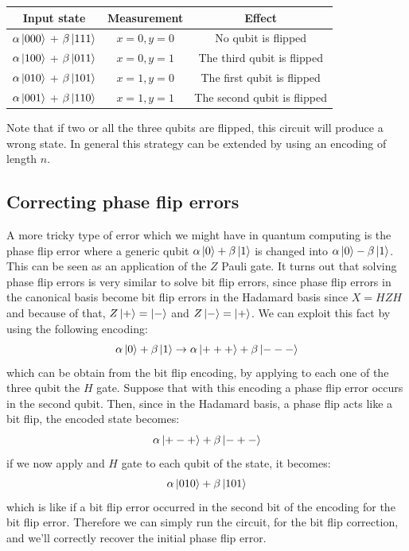 \documentclass{article}
\begin{document}
	\begin{table}[H]
		\begin{center}
		\begin{tabular}{|c|c|c|}
			\hline
			Input state & Measurement & Effect \\ \hline
			$\alpha\ket{000}$ + $\beta\ket{111}$& $x = 0, y = 0$  & No qubit is flipped \\  \hline
			$\alpha\ket{100}$ + $\beta\ket{011}$& $x = 0, y = 1$  & The third qubit is flipped \\ \hline
			$\alpha\ket{010}$ + $\beta\ket{101}$& $x = 1, y = 0$  & The first qubit is flipped \\ \hline
			$\alpha\ket{001}$ + $\beta\ket{110}$& $x = 1, y = 1$  & The second qubit is flipped \\ \hline
		\end{tabular}
		\end{center}
	\end{table}
	Note that if two or all the three qubits are flipped, this circuit will produce a wrong state. In general this strategy can be extended by using an encoding of length $n$. 

	\subsection{Correcting phase flip errors}
	A more tricky type of error which we might have in quantum computing is the phase flip error where a generic qubit $\alpha \ket{0} + \beta\ket{1}$ is changed into $\alpha\ket{0} - \beta\ket{1}$. This can be seen as an application of the $Z$ Pauli gate. It turns out that solving phase flip errors is very similar to solve bit flip errors, since phase flip errors in the canonical basis become bit flip errors in the Hadamard basis since $X = HZH$ and because of that, $Z\ket{+} = \ket{-}$ and $Z\ket{-} = \ket{+}$. We can exploit this fact by using the following encoding:
	\[ \alpha\ket{0} + \beta\ket{1} \rightarrow \alpha\ket{+++} + \beta\ket{---}\]
	which can be obtain from the bit flip encoding, by applying to each one of the three qubit the $H$ gate. Suppose that with this encoding a phase flip error occurs in the second qubit. Then, since in the Hadamard basis, a phase flip acts like a bit flip, the encoded state becomes:
	\[  \alpha\ket{+-+} + \beta\ket{-+-} \]
	if we now apply and $H$ gate to each qubit of the state, it becomes:
	\[  \alpha\ket{010} + \beta\ket{101} \]
	which is like if a bit flip error occurred in the second bit of the encoding for the bit flip error. Therefore we can simply run the circuit, for the bit flip correction, and we'll correctly recover the initial phase flip error.	
	
\end{document}
